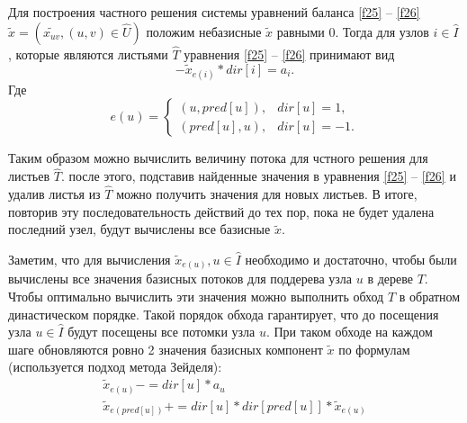 \documentclass[14pt]{extarticle}%
\begin{document}
Для построения частного решения системы уравнений баланса \eqref{f25} -- \eqref{f26} $\widetilde x=(\widetilde{x_{uv}},(u,v)\in \widehat{U})$ положим небазисные $\widetilde{x}$ равными $0$. Тогда для узлов $i\in \widehat{I}$, которые являются листьями $\widehat{T}$ уравнения \eqref{f25} -- \eqref{f26} принимают вид 
\begin{equation}\label{f241}
-\widetilde{x}_{e(i)}*dir[i]=a_i.
\end{equation}
Где 
\begin{equation*}
e(u)=\left\{
\begin{matrix}
(u, pred[u]),& dir[u]=1,\\
(pred[u],u),& dir[u]=-1.
\end{matrix}
\right.
\end{equation*}

Таким образом можно вычислить величину потока для чстного решения для листьев $\widehat{T}$. после этого, подставив найденные значения в уравнения \eqref{f25} -- \eqref{f26} и удалив листья из $\widehat{T}$ можно получить значения для новых листьев. В итоге, повторив эту последовательность действий до тех пор, пока не будет удалена последний узел, будут вычислены все базисные $\widetilde x$.

Заметим, что для вычисления $\widetilde{x}_{e(u)}, u\in \widehat{I}$ необходимо и достаточно, чтобы были вычислены все значения базисных потоков для поддерева узла $u$ в дереве $T$. Чтобы оптимально вычислить эти значения можно выполнить обход $T$ в обратном династическом порядке. Такой порядок обхода гарантирует, что до посещения узла $u\in \widehat{I}$ будут посещены все потомки узла $u$. При таком обходе на каждом шаге обновляются ровно 2 значения базисных компонент $\widetilde x$ по формулам (используется подход метода Зейделя):
\begin{equation}\label{f242}
\begin{gathered}
\widetilde{x}_{e(u)}-= dir[u]*a_u\\
\widetilde{x}_{e(pred[u])}+= dir[u]*dir[pred[u]]*\widetilde{x}_{e(u)}
\end{gathered}
\end{equation}

\end{document}
